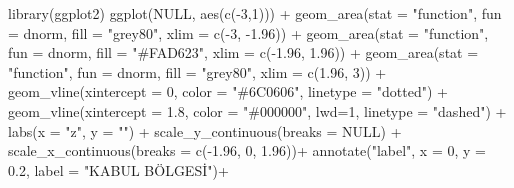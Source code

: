 \documentclass[
  12pt,
]{book}
\newenvironment{Shaded}{\begin{snugshade}}{\end{snugshade}}
\newcommand{\AttributeTok}[1]{\textcolor[rgb]{0.77,0.63,0.00}{#1}}
\newcommand{\ConstantTok}[1]{\textcolor[rgb]{0.00,0.00,0.00}{#1}}
\newcommand{\DecValTok}[1]{\textcolor[rgb]{0.00,0.00,0.81}{#1}}
\newcommand{\FloatTok}[1]{\textcolor[rgb]{0.00,0.00,0.81}{#1}}
\newcommand{\FunctionTok}[1]{\textcolor[rgb]{0.00,0.00,0.00}{#1}}
\newcommand{\NormalTok}[1]{#1}
\newcommand{\SpecialCharTok}[1]{\textcolor[rgb]{0.00,0.00,0.00}{#1}}
\newcommand{\StringTok}[1]{\textcolor[rgb]{0.31,0.60,0.02}{#1}}
\begin{document}
\begin{Shaded}
\begin{Highlighting}[]
\FunctionTok{library}\NormalTok{(ggplot2)}
\FunctionTok{ggplot}\NormalTok{(}\ConstantTok{NULL}\NormalTok{, }\FunctionTok{aes}\NormalTok{(}\FunctionTok{c}\NormalTok{(}\SpecialCharTok{{-}}\DecValTok{3}\NormalTok{,}\DecValTok{1}\NormalTok{))) }\SpecialCharTok{+}
  \FunctionTok{geom\_area}\NormalTok{(}\AttributeTok{stat =} \StringTok{"function"}\NormalTok{, }\AttributeTok{fun =}\NormalTok{ dnorm, }\AttributeTok{fill =} \StringTok{"grey80"}\NormalTok{, }\AttributeTok{xlim =} \FunctionTok{c}\NormalTok{(}\SpecialCharTok{{-}}\DecValTok{3}\NormalTok{, }\SpecialCharTok{{-}}\FloatTok{1.96}\NormalTok{)) }\SpecialCharTok{+}
  \FunctionTok{geom\_area}\NormalTok{(}\AttributeTok{stat =} \StringTok{"function"}\NormalTok{, }\AttributeTok{fun =}\NormalTok{ dnorm, }\AttributeTok{fill =} \StringTok{"\#FAD623"}\NormalTok{, }\AttributeTok{xlim =} \FunctionTok{c}\NormalTok{(}\SpecialCharTok{{-}}\FloatTok{1.96}\NormalTok{, }\FloatTok{1.96}\NormalTok{)) }\SpecialCharTok{+}
  \FunctionTok{geom\_area}\NormalTok{(}\AttributeTok{stat =} \StringTok{"function"}\NormalTok{, }\AttributeTok{fun =}\NormalTok{ dnorm, }\AttributeTok{fill =} \StringTok{"grey80"}\NormalTok{, }\AttributeTok{xlim =} \FunctionTok{c}\NormalTok{(}\FloatTok{1.96}\NormalTok{, }\DecValTok{3}\NormalTok{)) }\SpecialCharTok{+}
  \FunctionTok{geom\_vline}\NormalTok{(}\AttributeTok{xintercept =} \DecValTok{0}\NormalTok{, }\AttributeTok{color =} \StringTok{"\#6C0606"}\NormalTok{, }\AttributeTok{linetype =} \StringTok{"dotted"}\NormalTok{) }\SpecialCharTok{+}
  \FunctionTok{geom\_vline}\NormalTok{(}\AttributeTok{xintercept =} \FloatTok{1.8}\NormalTok{, }\AttributeTok{color =} \StringTok{"\#000000"}\NormalTok{, }\AttributeTok{lwd=}\DecValTok{1}\NormalTok{, }\AttributeTok{linetype =} \StringTok{"dashed"}\NormalTok{) }\SpecialCharTok{+}
  \FunctionTok{labs}\NormalTok{(}\AttributeTok{x =} \StringTok{"z"}\NormalTok{, }\AttributeTok{y =} \StringTok{""}\NormalTok{) }\SpecialCharTok{+}
  \FunctionTok{scale\_y\_continuous}\NormalTok{(}\AttributeTok{breaks =} \ConstantTok{NULL}\NormalTok{) }\SpecialCharTok{+}
  \FunctionTok{scale\_x\_continuous}\NormalTok{(}\AttributeTok{breaks =} \FunctionTok{c}\NormalTok{(}\SpecialCharTok{{-}}\FloatTok{1.96}\NormalTok{, }\DecValTok{0}\NormalTok{, }\FloatTok{1.96}\NormalTok{))}\SpecialCharTok{+}
  \FunctionTok{annotate}\NormalTok{(}\StringTok{"label"}\NormalTok{, }\AttributeTok{x =} \DecValTok{0}\NormalTok{, }\AttributeTok{y =} \FloatTok{0.2}\NormalTok{, }\AttributeTok{label =} \StringTok{"KABUL BÖLGESİ"}\NormalTok{)}\SpecialCharTok{+}

\end{Highlighting}
\end{Shaded}
\end{document}
